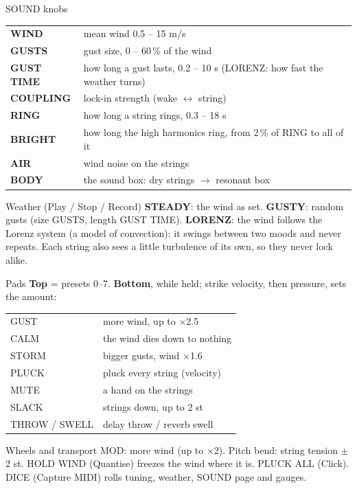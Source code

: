 \documentclass{article}
\newcommand{\FX}[1]{\textcolor{fxc}{#1}}
\newcommand{\WN}[1]{\textcolor{wndc}{#1}}
\newcommand{\ST}[1]{\textcolor{strc}{#1}}
\newcommand{\WX}[1]{\textcolor{wxc}{#1}}
\begin{document}
\begin{minipage}[t]{70mm}\vspace{0pt}
\begin{card}{SOUND knobs}
\fontsize{6.8}{8.1}\selectfont
\begin{tabularx}{\linewidth}{@{}l L@{}}
\WN{\textbf{WIND}} & mean wind 0.5 -- 15 m/s \\
\WN{\textbf{GUSTS}} & gust size, 0 -- 60\,\% of the wind \\
\WN{\textbf{GUST TIME}} & how long a gust lasts, 0.2 -- 10 s (LORENZ: how fast the weather turns) \\
\textbf{COUPLING} & lock-in strength (wake \(\leftrightarrow\) string) \\
\ST{\textbf{RING}} & how long a string rings, 0.3 -- 18 s \\
\ST{\textbf{BRIGHT}} & how long the high harmonics ring, from 2\,\% of RING to all of it \\
\WN{\textbf{AIR}} & wind noise on the strings \\
\textbf{BODY} & the sound box: dry strings \(\to\) resonant box \\
\end{tabularx}
\end{card}
\begin{card}{Weather (Play / Stop / Record)}
\WX{\textbf{STEADY}}: the wind as set. \WX{\textbf{GUSTY}}: random gusts (size GUSTS, length GUST TIME).
\WX{\textbf{LORENZ}}: the wind follows the Lorenz system (a model of convection): it swings between two moods
and never repeats. Each string also sees a little turbulence of its own, so they never lock alike.
\end{card}
\end{minipage}\hfill
\begin{minipage}[t]{62mm}\vspace{0pt}
\begin{card}{Pads}
\textbf{Top} = presets 0--7. \textbf{Bottom}, while held; strike velocity, then pressure, sets the amount:
\fontsize{6.6}{7.9}\selectfont
\begin{tabularx}{\linewidth}{@{}l L@{}}
\WN{GUST} & more wind, up to \(\times\)2.5 \\
\WN{CALM} & the wind dies down to nothing \\
\WN{STORM} & bigger gusts, wind \(\times\)1.6 \\
\ST{PLUCK} & pluck every string (velocity) \\
\ST{MUTE} & a hand on the strings \\
\ST{SLACK} & strings down, up to 2 st \\
\FX{THROW / SWELL} & delay throw / reverb swell \\
\end{tabularx}
\end{card}
\begin{card}{Wheels and transport}
MOD: more wind (up to \(\times\)2). Pitch bend: string tension \(\pm\)2 st. HOLD WIND (Quantise) freezes the wind
where it is. PLUCK ALL (Click). DICE (Capture MIDI) rolls tuning, weather, SOUND page and gauges.
\end{card}
\end{minipage}\hfill
\end{document}
